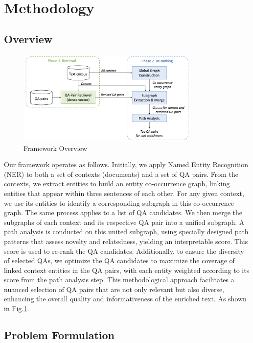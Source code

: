 \documentclass[11pt]{article}
\begin{document}
% 
\section{Methodology}
\label{sec:methodology}
\subsection{Overview}
\begin{figure}[t]
  \centering
  \includegraphics[width=0.8\textwidth]{submissions/Tung2023/figs/overview_1.png}
  \caption{Framework Overview}
  \label{fig:overview_1}
\end{figure}

Our framework operates as follows. Initially, we apply Named Entity Recognition (NER) to both a set of contexts (documents) and a set of QA pairs. From the contexts, we extract entities to build an entity co-occurrence graph, linking entities that appear within three sentences of each other. For any given context, we use its entities to identify a corresponding subgraph in this co-occurrence graph. The same process applies to a list of QA candidates. We then merge the subgraphs of each context and its respective QA pair into a unified subgraph. A path analysis is conducted on this united subgraph, using specially designed path patterns that assess novelty and relatedness, yielding an interpretable score. This score is used to re-rank the QA candidates. Additionally, to ensure the diversity of selected QAs, we optimize the QA candidates to maximize the coverage of linked context entities in the QA pairs, with each entity weighted according to its score from the path analysis step. This methodological approach facilitates a nuanced selection of QA pairs that are not only relevant but also diverse, enhancing the overall quality and informativeness of the enriched text. As shown in Fig.\ref{fig:overview_1}.




\subsection{Problem Formulation}
\end{document}
